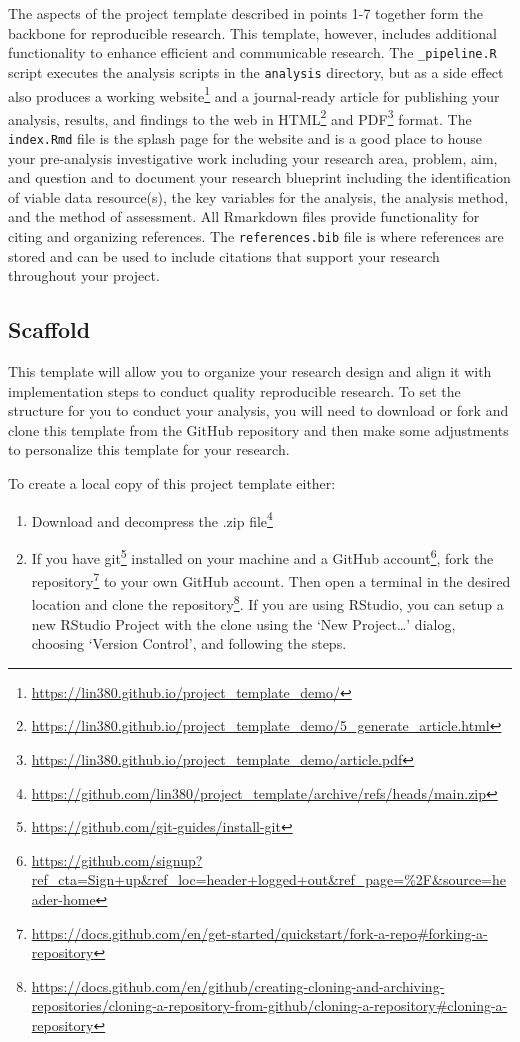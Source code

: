 \documentclass[
  letterpaper,
]{latex/krantz}
\providecommand{\tightlist}{%
  \setlength{\itemsep}{0pt}\setlength{\parskip}{0pt}}\usepackage{longtable,booktabs,array}
\DeclareRobustCommand{\href}[2]{#2\footnote{\url{#1}}}
\begin{document}
The aspects of the project template described in points 1-7 together
form the backbone for reproducible research. This template, however,
includes additional functionality to enhance efficient and communicable
research. The \texttt{\_pipeline.R} script executes the analysis scripts
in the \texttt{analysis} directory, but as a side effect also produces
\href{https://lin380.github.io/project_template_demo/}{a working
website} and a journal-ready article for publishing your analysis,
results, and findings to the web in
\href{https://lin380.github.io/project_template_demo/5_generate_article.html}{HTML}
and
\href{https://lin380.github.io/project_template_demo/article.pdf}{PDF}
format. The \texttt{index.Rmd} file is the splash page for the website
and is a good place to house your pre-analysis investigative work
including your research area, problem, aim, and question and to document
your research blueprint including the identification of viable data
resource(s), the key variables for the analysis, the analysis method,
and the method of assessment. All Rmarkdown files provide functionality
for citing and organizing references. The \texttt{references.bib} file
is where references are stored and can be used to include citations that
support your research throughout your project.

\hypertarget{scaffold}{%
\subsection{Scaffold}\label{scaffold}}

This template will allow you to organize your research design and align
it with implementation steps to conduct quality reproducible research.
To set the structure for you to conduct your analysis, you will need to
download or fork and clone this template from the GitHub repository and
then make some adjustments to personalize this template for your
research.

To create a local copy of this project template either:

\begin{enumerate}
\def\labelenumi{\arabic{enumi}.}
\tightlist
\item
  Download and decompress the
  \href{https://github.com/lin380/project_template/archive/refs/heads/main.zip}{.zip
  file}
\item
  If you have \href{https://github.com/git-guides/install-git}{git}
  installed on your machine and a
  \href{https://github.com/signup?ref_cta=Sign+up\&ref_loc=header+logged+out\&ref_page=\%2F\&source=header-home}{GitHub
  account},
  \href{https://docs.github.com/en/get-started/quickstart/fork-a-repo\#forking-a-repository}{fork
  the repository} to your own GitHub account. Then open a terminal in
  the desired location and
  \href{https://docs.github.com/en/github/creating-cloning-and-archiving-repositories/cloning-a-repository-from-github/cloning-a-repository\#cloning-a-repository}{clone
  the repository}. If you are using RStudio, you can setup a new RStudio
  Project with the clone using the `New Project\ldots{}' dialog,
  choosing `Version Control', and following the steps.
\end{enumerate}
\end{document}
